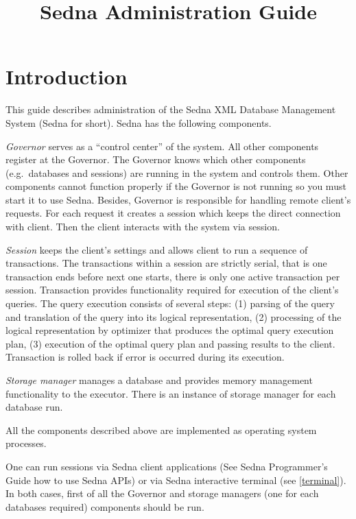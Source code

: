 \documentclass[a4paper,12pt]{article}
\title{Sedna Administration Guide}
\date{}
\newcommand{\TocAt}[6]{}   %
\begin{document}
\sloppy
\maketitle

\TocAt*{section,subsection,subsubsection}
\TocAt*{subsection,subsubsection}

\tableofcontents
\newpage

\section{Introduction} This guide describes administration of the Sedna XML
Database Management System (Sedna for short). Sedna has the following
components.

\emph{Governor} serves as a ``control center'' of the system. All other
components register at the Governor. The Governor knows which other components
(e.g.\ databases and sessions) are running in the system and controls them.
Other components cannot function properly if the Governor is not running so you
must start it to use Sedna. Besides, Governor is responsible for handling remote
client's requests. For each request it creates a session which keeps the direct
connection with client. Then the client interacts with the system via session.

\emph{Session} keeps the client's settings and allows client to run a sequence
of transactions. The transactions within a session are strictly serial, that is
one transaction ends before next one starts, there is only one active
transaction per session. Transaction provides functionality required for
execution of the client's queries. The query execution consists of several
steps: (1) parsing of the query and translation of the query into its logical
representation, (2) processing of the logical representation by optimizer that
produces the optimal query execution plan, (3) execution of the optimal query
plan and passing results to the client. Transaction is rolled back if error is
occurred during its execution.

\emph{Storage manager} manages a database and provides memory management
functionality to the executor. There is an instance of storage manager for each
database run.

All the components described above are implemented as operating system
processes.

One can run sessions via Sedna client applications (See Sedna Programmer's Guide
how to use Sedna APIs) or via Sedna interactive terminal (see \ref{terminal}).
In both cases, first of all the Governor and storage managers (one for each
databases required) components should be run.
\end{document}
